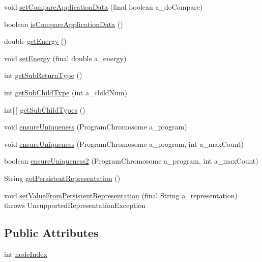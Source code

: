 \begin{DoxyCompactItemize}
\item 
void \hyperlink{classorg_1_1jgap_1_1gp_1_1_command_gene_ac639ada88f209d8bbf291c573634c609}{set\-Compare\-Application\-Data} (final boolean a\-\_\-do\-Compare)
\item 
boolean \hyperlink{classorg_1_1jgap_1_1gp_1_1_command_gene_add4162190bb3649a612b04cf2d41e9cc}{is\-Compare\-Application\-Data} ()
\item 
double \hyperlink{classorg_1_1jgap_1_1gp_1_1_command_gene_ab3c21c981a1d9d1ebb7f42b8bfb87456}{get\-Energy} ()
\item 
void \hyperlink{classorg_1_1jgap_1_1gp_1_1_command_gene_af4f7270a908a7b3bed573d33b0ae761a}{set\-Energy} (final double a\-\_\-energy)
\item 
int \hyperlink{classorg_1_1jgap_1_1gp_1_1_command_gene_af1493149bbcf86ee3d848b493f7adcc6}{get\-Sub\-Return\-Type} ()
\item 
int \hyperlink{classorg_1_1jgap_1_1gp_1_1_command_gene_a9c00a591e99e0f1139388a334e613d3e}{get\-Sub\-Child\-Type} (int a\-\_\-child\-Num)
\item 
int\mbox{[}$\,$\mbox{]} \hyperlink{classorg_1_1jgap_1_1gp_1_1_command_gene_a479e8b5355b16cf06b8cbd02cd1dbb6c}{get\-Sub\-Child\-Types} ()
\item 
void \hyperlink{classorg_1_1jgap_1_1gp_1_1_command_gene_abd086341b627c05cda554a22697ab3ff}{ensure\-Uniqueness} (Program\-Chromosome a\-\_\-program)
\item 
void \hyperlink{classorg_1_1jgap_1_1gp_1_1_command_gene_aaf8dad002debcb8c75f5ae7ef807dc3e}{ensure\-Uniqueness} (Program\-Chromosome a\-\_\-program, int a\-\_\-max\-Count)
\item 
boolean \hyperlink{classorg_1_1jgap_1_1gp_1_1_command_gene_ad4cebfe42a7a1c3a326e2ac4e7003b3a}{ensure\-Uniqueness2} (Program\-Chromosome a\-\_\-program, int a\-\_\-max\-Count)
\item 
String \hyperlink{classorg_1_1jgap_1_1gp_1_1_command_gene_a31121f568fa8715838155bef3a04cab2}{get\-Persistent\-Representation} ()
\item 
void \hyperlink{classorg_1_1jgap_1_1gp_1_1_command_gene_a161c170b4493de85203147a84ac13a3b}{set\-Value\-From\-Persistent\-Representation} (final String a\-\_\-representation)  throws Unsupported\-Representation\-Exception 
\end{DoxyCompactItemize}
\subsection*{Public Attributes}
\begin{DoxyCompactItemize}
\item 
int \hyperlink{classorg_1_1jgap_1_1gp_1_1_command_gene_a6bb62473b76e1ada228260009a972dc2}{node\-Index}
\end{DoxyCompactItemize}
